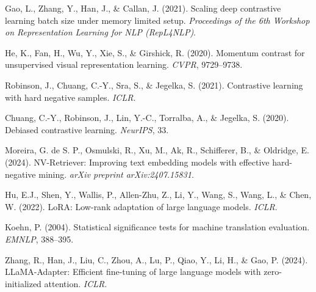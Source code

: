 \documentclass[a4paper]{article}
\begin{document}
\begin{enumerate}[label={[\arabic*]},leftmargin=*,itemsep=3pt]
\item Gao, L., Zhang, Y., Han, J., \& Callan, J. (2021). Scaling deep contrastive learning batch size under memory limited setup. \textit{Proceedings of the 6th Workshop on Representation Learning for NLP (RepL4NLP)}.
\item He, K., Fan, H., Wu, Y., Xie, S., \& Girshick, R. (2020). Momentum contrast for unsupervised visual representation learning. \textit{CVPR}, 9729--9738.
\item Robinson, J., Chuang, C.-Y., Sra, S., \& Jegelka, S. (2021). Contrastive learning with hard negative samples. \textit{ICLR}.
\item Chuang, C.-Y., Robinson, J., Lin, Y.-C., Torralba, A., \& Jegelka, S. (2020). Debiased contrastive learning. \textit{NeurIPS}, 33.
\item Moreira, G. de S. P., Osmulski, R., Xu, M., Ak, R., Schifferer, B., \& Oldridge, E. (2024). NV-Retriever: Improving text embedding models with effective hard-negative mining. \textit{arXiv preprint arXiv:2407.15831}.
\item Hu, E.J., Shen, Y., Wallis, P., Allen-Zhu, Z., Li, Y., Wang, S., Wang, L., \& Chen, W. (2022). LoRA: Low-rank adaptation of large language models. \textit{ICLR}.
\item Koehn, P. (2004). Statistical significance tests for machine translation evaluation. \textit{EMNLP}, 388--395.
\item Zhang, R., Han, J., Liu, C., Zhou, A., Lu, P., Qiao, Y., Li, H., \& Gao, P. (2024). LLaMA-Adapter: Efficient fine-tuning of large language models with zero-initialized attention. \textit{ICLR}.
\end{enumerate}
\end{document}
